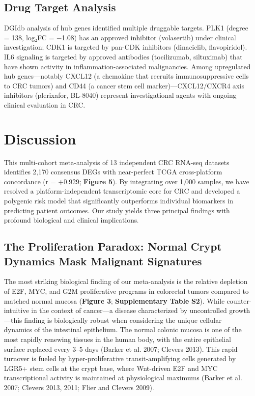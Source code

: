 \documentclass[
  12pt,
]{article}
\begin{document}
\subsection{Drug Target Analysis}\label{drug-target-analysis-1}

DGIdb analysis of hub genes identified multiple druggable targets. PLK1
(degree = 138, log₂FC = −1.08) has an approved inhibitor (volasertib)
under clinical investigation; CDK1 is targeted by pan-CDK inhibitors
(dinaciclib, flavopiridol). IL6 signaling is targeted by approved
antibodies (tocilizumab, siltuximab) that have shown activity in
inflammation-associated malignancies. Among upregulated hub
genes---notably CXCL12 (a chemokine that recruits immunosuppressive
cells to CRC tumors) and CD44 (a cancer stem cell marker)---CXCL12/CXCR4
axis inhibitors (plerixafor, BL-8040) represent investigational agents
with ongoing clinical evaluation in CRC.

\section{Discussion}\label{discussion}

This multi-cohort meta-analysis of 13 independent CRC RNA-seq datasets
identifies 2,170 consensus DEGs with near-perfect TCGA cross-platform
concordance (r = +0.929; \textbf{Figure 5}). By integrating over 1,000
samples, we have resolved a platform-independent transcriptomic core for
CRC and developed a polygenic risk model that significantly outperforms
individual biomarkers in predicting patient outcomes. Our study yields
three principal findings with profound biological and clinical
implications.

\subsection{The Proliferation Paradox: Normal Crypt Dynamics Mask
Malignant
Signatures}\label{the-proliferation-paradox-normal-crypt-dynamics-mask-malignant-signatures}

The most striking biological finding of our meta-analysis is the
relative depletion of E2F, MYC, and G2M proliferative programs in
colorectal tumors compared to matched normal mucosa (\textbf{Figure 3};
\textbf{Supplementary Table S2}). While counter-intuitive in the context
of cancer---a disease characterized by uncontrolled growth---this
finding is biologically robust when considering the unique cellular
dynamics of the intestinal epithelium. The normal colonic mucosa is one
of the most rapidly renewing tissues in the human body, with the entire
epithelial surface replaced every 3--5 days (Barker et al. 2007; Clevers
2013). This rapid turnover is fueled by hyper-proliferative
transit-amplifying cells generated by LGR5+ stem cells at the crypt
base, where Wnt-driven E2F and MYC transcriptional activity is
maintained at physiological maximums (Barker et al. 2007; Clevers 2013,
2011; Flier and Clevers 2009).
\end{document}
